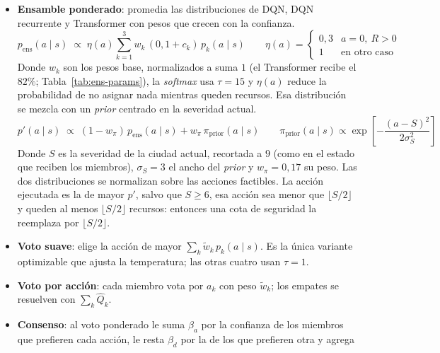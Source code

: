 \documentclass[../00_Main/Main.tex]{subfiles}
\begin{document}
\begin{itemize}
    \item \textbf{Ensamble ponderado}: promedia las
    distribuciones de DQN, DQN recurrente y Transformer con pesos que crecen
    con la confianza.
    \begin{equation}
      p_{\mathrm{ens}}(a \mid s) \;\propto\;
      \eta(a)\sum_{k=1}^{3} w_k\,(0{,}1 + c_k)\, p_k(a \mid s)
      \qquad
      \eta(a) = \begin{cases} 0{,}3 & a = 0,\ R > 0 \\ 1 & \text{en otro caso} \end{cases}
      \label{eq:ens-soft}
    \end{equation}    Donde $w_k$ son los pesos base, normalizados a suma $1$ (el Transformer
    recibe el $82\%$; Tabla~\ref{tab:ens-params}), la \emph{softmax} usa $\tau = 15$ y
    $\eta(a)$ reduce la probabilidad de no asignar nada mientras queden
    recursos. Esa distribuci\'on se mezcla con un \emph{prior} centrado en la
    severidad actual.
    \begin{equation}
      p'(a\mid s) \;\propto\; (1-w_\pi)\,p_{\mathrm{ens}}(a\mid s)
      + w_\pi\, \pi_{\mathrm{prior}}(a \mid s)
      \qquad
      \pi_{\mathrm{prior}}(a\mid s) \propto
      \exp\!\left[-\frac{(a-S)^2}{2\sigma_S^2}\right]
      \label{eq:ens-prior}
    \end{equation}    Donde $S$ es la severidad de la ciudad actual, recortada a $9$ (como
    en el estado que reciben los miembros), $\sigma_S = 3$ el ancho del
    \emph{prior} y $w_\pi = 0{,}17$ su peso. Las dos distribuciones se
    normalizan sobre las acciones factibles. La acci\'on
    ejecutada es la de mayor $p'$, salvo que $S \ge 6$, esa acci\'on sea
    menor que $\lfloor S/2 \rfloor$ y queden al menos $\lfloor S/2 \rfloor$
    recursos: entonces una cota de seguridad la
    reemplaza por $\lfloor S/2 \rfloor$.
    \item \textbf{Voto suave}: elige la acci\'on de mayor
    $\sum_k \tilde w_k\, p_k(a\mid s)$. Es la \'unica variante optimizable que
    ajusta la temperatura; las otras cuatro usan $\tau = 1$.
    \item \textbf{Voto por acci\'on}: cada miembro vota
    por $a_k$ con peso $\tilde w_k$; los empates se resuelven con
    $\sum_k \hat Q_k$.
    \item \textbf{Consenso}: al voto ponderado le
    suma $\beta_a$ por la confianza de los miembros que prefieren cada
    acci\'on, le resta $\beta_d$ por la de los que prefieren otra y agrega

\end{itemize}
\end{document}
